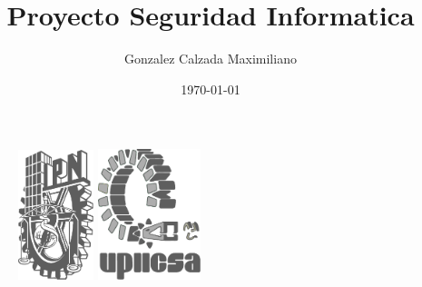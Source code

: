 \documentclass{article}
\title{Proyecto Seguridad Informatica}
\author{Gonzalez Calzada Maximiliano}
\date{\today}
\begin{document}
    \thispagestyle{empty}
        
    \begin{figure}[ht]
            \includegraphics[width=2.2cm]{IPN_Logo.pdf}
            \label{LogoIPN}
        \endminipage
        \hspace{0.60\textwidth}
            \includegraphics[width=3cm]{UPIICSA_Logo.pdf}
            \label{LogoUPIICSA}
        \endminipage
    \end{figure}
	
\end{document}
